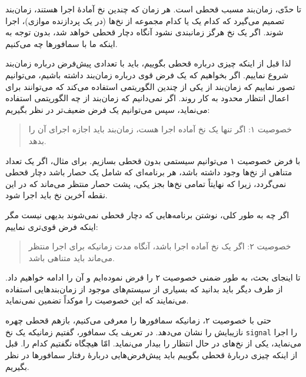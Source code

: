 \documentclass{book}
\begin{document}
    تا حدّی، زمان‌بند مسبب قحطی است. هر زمان که چندین نخ آمادهٔ اجرا هستند، زمان‌بند تصمیم می‌گیرد که کدام یک یا 
     کدام مجموعه از نخ‌ها (در یک پردازنده موازی)، اجرا شوند. اگر یک نخ هرگز زمانبندی نشود آنگاه دچار قحطی خواهد شد، بدون توجه به اینکه ما با سمافورها چه می‌کنیم. 

    لذا قبل از اینکه چیزی درباره قحطی بگوییم،‌ باید با تعدادی پیش‌فرض درباره زمان‌بند شروع نماییم. 
    اگر بخواهیم که یک فرض قوی درباره زمان‌بند داشته باشیم، 
    می‌توانیم تصور نماییم که زمان‌بند از یکی از چندین الگوریتمی  استفاده می‌‌کند که می‌توانند برای اعمال انتظار محدود به کار روند. 
    اگر نمی‌دانیم که زمان‌بند از چه الگوریتمی استفاده می‌نماید، سپس می‌توانیم یک فرض ضعیف‌تر در نظر بگیریم:

\begin{quote}
    خصوصیت ۱: اگر تنها یک نخ آماده اجرا هست، زمان‌بند باید اجازه اجرای آن را بدهد. 
\end{quote}

    با فرض خصوصیت ۱ می‌توانیم سیستمی بدون قحطی بسازیم. 
    برای مثال، اگر یک تعداد متناهی از نخ‌ها وجود داشته باشد، هر برنامه‌ای که شامل یک حصار باشد دچار قحطی نمی‌گردد، زیرا که 
    نهایتاً تمامی نخ‌ها بجز یکی، پشت حصار منتظر می‌ماند که در این نقطه آخرین نخ باید اجرا شود. 

    اگر چه به طور کلی، نوشتن برنامه‌هایی که دچار قحطی نمی‌شوند بدیهی نیست مگر اینکه فرض قوی‌تری نماییم:

\begin{quote}
    خصوصیت ۲: اگر یک نخ آماده اجرا باشد، آنگاه مدت زمانیکه برای اجرا منتظر می‌ماند باید متناهی باشد. 
\end{quote}

    تا  اینجای بحث، به طور ضمنی خصوصیت ۲ را فرض نموده‌ایم و آن را ادامه خواهیم داد. 
    از طرف دیگر باید بدانید که بسیاری از سیستم‌های موجود از زمان‌بندهایی استفاده می‌نمایند که این خصوصیت را موکداً تضمین نمی‌نماید. 

    حتی با خصوصیت ۲، زمانیکه سمافورها را معرفی می‌کنیم، بازهم قحطی چهره نازیبایش را نشان می‌دهد. 
    در تعریف یک سمافور، گفتیم زمانیکه یک نخ {\tt signal} را اجرا می‌نماید، یکی از نخ‌های در حال انتظار را بیدار می‌نماید. امّا هیچگاه نگفتیم کدام را. 
    قبل از اینکه چیزی دربارهٔ قحطی بگوییم باید پیش‌فرض‌هایی دربارهٔ رفتار سمافورها در نظر بگیریم. 
\end{document}

